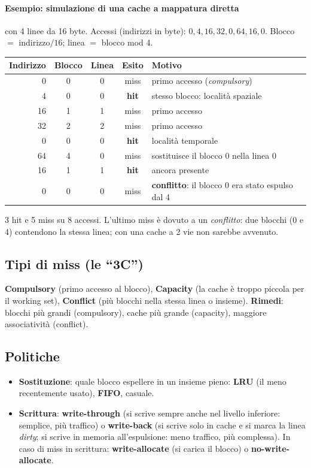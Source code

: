 \paragraph{Esempio: simulazione di una cache a mappatura diretta} con 4 linee da 16 byte. Accessi (indirizzi in byte): $0, 4, 16, 32, 0, 64, 16, 0$. Blocco $=$ indirizzo$/16$; linea $=$ blocco mod 4.
\begin{center}
\small
\begin{tabular}{@{}rcccl@{}}
\toprule
\textbf{Indirizzo} & \textbf{Blocco} & \textbf{Linea} & \textbf{Esito} & \textbf{Motivo} \\
\midrule
0 & 0 & 0 & miss & primo accesso (\emph{compulsory}) \\
4 & 0 & 0 & \textbf{hit} & stesso blocco: località spaziale \\
16 & 1 & 1 & miss & primo accesso \\
32 & 2 & 2 & miss & primo accesso \\
0 & 0 & 0 & \textbf{hit} & località temporale \\
64 & 4 & 0 & miss & sostituisce il blocco 0 nella linea 0 \\
16 & 1 & 1 & \textbf{hit} & ancora presente \\
0 & 0 & 0 & miss & \textbf{conflitto}: il blocco 0 era stato espulso dal 4 \\
\bottomrule
\end{tabular}
\end{center}
3 hit e 5 miss su 8 accessi. L'ultimo miss è dovuto a un \emph{conflitto}: due blocchi (0 e 4) contendono la stessa linea; con una cache a 2 vie non sarebbe avvenuto.

\subsection{Tipi di miss (le ``3C'')}
\textbf{Compulsory} (primo accesso al blocco), \textbf{Capacity} (la cache è troppo piccola per il working set), \textbf{Conflict} (più blocchi nella stessa linea o insieme). \textbf{Rimedi}: blocchi più grandi (compulsory), cache più grande (capacity), maggiore associatività (conflict).

\subsection{Politiche}
\begin{itemize}
    \item \textbf{Sostituzione}: quale blocco espellere in un insieme pieno: \textbf{LRU} (il meno recentemente usato), \textbf{FIFO}, casuale.
    \item \textbf{Scrittura}: \textbf{write-through} (si scrive sempre anche nel livello inferiore: semplice, più traffico) o \textbf{write-back} (si scrive solo in cache e si marca la linea \emph{dirty}; si scrive in memoria all'espulsione: meno traffico, più complessa). In caso di miss in scrittura: \textbf{write-allocate} (si carica il blocco) o \textbf{no-write-allocate}.
\end{itemize}

